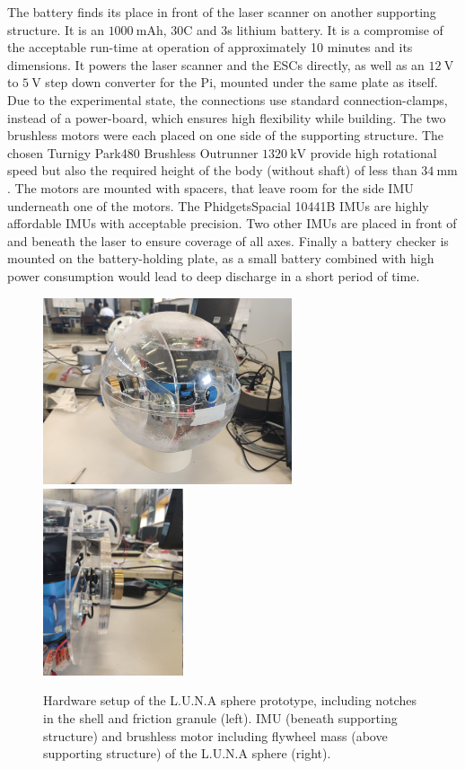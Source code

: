 The battery finds its place in front of the laser scanner on another supporting structure. It is an $\SI{1000}{\milli\ampere\hour}$, 30C and 3s lithium battery. 
It is a compromise of the acceptable run-time at operation of approximately 10 minutes and its dimensions. 
It powers the laser scanner and the ESCs directly, as well as an $\SI{12}{\volt}$ to $\SI{5}{\volt}$ step down converter for the Pi, mounted under the same plate as itself. 
Due to the experimental state, the connections use standard connection-clamps, instead of a power-board, which ensures high flexibility while building. 
The two brushless motors were each placed on one side of the supporting structure. The chosen Turnigy Park480 Brushless Outrunner $\SI{1320}{\kilo\volt}$ \cite{turnigymotor} provide high rotational speed but also the required height of the body (without shaft) of less than $\SI{34}{\milli\meter}$.
The motors are mounted with spacers, that leave room for the side IMU underneath one of the motors. 
The PhidgetsSpacial 10441B IMUs \cite{imuphidgets} are highly affordable IMUs with acceptable precision.
Two other IMUs are placed in front of and beneath the laser to ensure coverage of all axes. 
Finally a battery checker is mounted on the battery-holding plate, as a small battery combined with high power consumption would lead to deep discharge in a short period of time.

\begin{figure}
\centering
\includegraphics[height=55mm]{../Media/sphereFullshellLeft.jpg}
\hfill
\includegraphics[height=55mm]{../Media/sphereRightMotor.jpg}   
\caption{Hardware setup of the L.U.N.A sphere prototype, including notches in the shell and friction granule (left). IMU (beneath supporting structure) and brushless motor  including flywheel mass (above supporting structure) of the L.U.N.A sphere (right).}
\label{sec:TechnicalApproach:fig:setup}
\end{figure}

